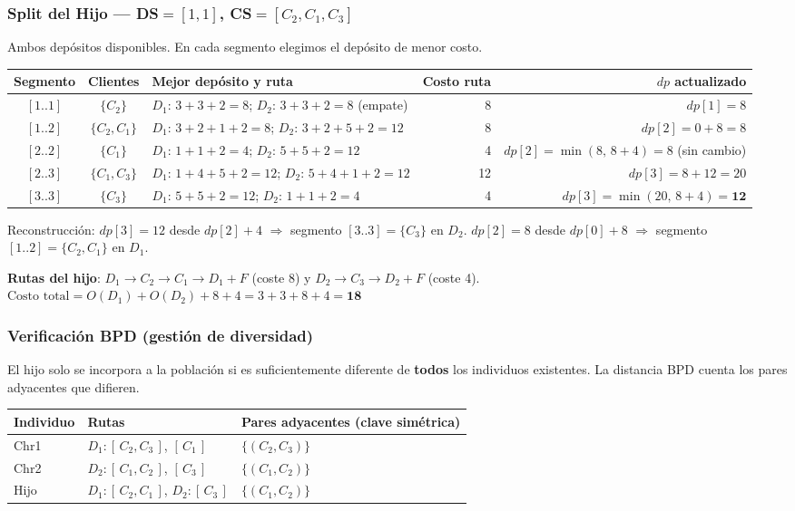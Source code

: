 \documentclass[12pt,a4paper]{article}
\begin{document}
\subsubsection*{Split del Hijo — DS$=[1,1]$, CS$=[C_2,C_1,C_3]$}

Ambos depósitos disponibles. En cada segmento elegimos el depósito de menor costo.

\begin{center}
\begin{tabular}{cclrr}
\toprule
Segmento & Clientes & Mejor depósito y ruta & Costo ruta & $dp$ actualizado \\
\midrule
$[1..1]$ & $\{C_2\}$     & $D_1$: $3+3+2=8$; $D_2$: $3+3+2=8$ (empate)& 8  & $dp[1]=8$ \\
$[1..2]$ & $\{C_2,C_1\}$ & $D_1$: $3+2+1+2=8$; $D_2$: $3+2+5+2=12$    & 8  & $dp[2]=0+8=8$ \\
$[2..2]$ & $\{C_1\}$     & $D_1$: $1+1+2=4$; $D_2$: $5+5+2=12$         & 4  & $dp[2]=\min(8,\,8+4)=8$ (sin cambio) \\
$[2..3]$ & $\{C_1,C_3\}$ & $D_1$: $1+4+5+2=12$; $D_2$: $5+4+1+2=12$   & 12 & $dp[3]=8+12=20$ \\
$[3..3]$ & $\{C_3\}$     & $D_1$: $5+5+2=12$; \textbf{$D_2$}: $1+1+2=4$& 4  & $dp[3]=\min(20,\,8+4)=\mathbf{12}$ \\
\bottomrule
\end{tabular}
\end{center}

Reconstrucción:
$dp[3]=12$ desde $dp[2]+4$ $\Rightarrow$ segmento $[3..3]=\{C_3\}$ en $D_2$.
$dp[2]=8$ desde $dp[0]+8$ $\Rightarrow$ segmento $[1..2]=\{C_2,C_1\}$ en $D_1$.

\textbf{Rutas del hijo}: $D_1\!\to\!C_2\!\to\!C_1\!\to\!D_1 + F$ (coste 8) y $D_2\!\to\!C_3\!\to\!D_2 + F$ (coste 4).
$\text{Costo total} = O(D_1)+O(D_2)+8+4 = 3+3+8+4 = \mathbf{18}$ \checkmark

\subsubsection*{Verificación BPD (gestión de diversidad)}

El hijo solo se incorpora a la población si es suficientemente diferente de \textbf{todos} los individuos existentes. La distancia BPD cuenta los pares adyacentes que difieren.

\begin{center}
\begin{tabular}{lll}
\toprule
Individuo & Rutas & Pares adyacentes (clave simétrica) \\
\midrule
Chr1  & $D_1:[\,C_2,C_3\,]$, $[\,C_1\,]$ & $\{(C_2,C_3)\}$ \\
Chr2  & $D_2:[\,C_1,C_2\,]$, $[\,C_3\,]$ & $\{(C_1,C_2)\}$ \\
Hijo  & $D_1:[\,C_2,C_1\,]$, $D_2:[\,C_3\,]$ & $\{(C_1,C_2)\}$ \\
\bottomrule
\end{tabular}
\end{center}
\end{document}
